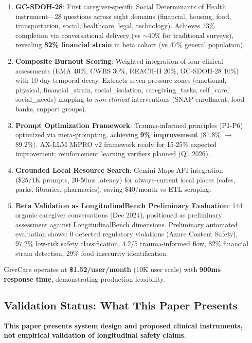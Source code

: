 \documentclass{article}
\begin{document}
\begin{enumerate}
    \item \textbf{GC-SDOH-28}: First caregiver-specific Social Determinants of Health instrument—28 questions across eight domains (financial, housing, food, transportation, social, healthcare, legal, technology). Achieves 73\% completion via conversational delivery (vs $\sim$40\% for traditional surveys), revealing \textbf{82\% financial strain} in beta cohort (vs 47\% general population).
    \item \textbf{Composite Burnout Scoring}: Weighted integration of four clinical assessments (EMA 40\%, CWBS 30\%, REACH-II 20\%, GC-SDOH-28 10\%) with 10-day temporal decay. Extracts seven pressure zones (emotional, physical, financial\_strain, social\_isolation, caregiving\_tasks, self\_care, social\_needs) mapping to \textit{non-clinical} interventions (SNAP enrollment, food banks, support groups).
    \item \textbf{Prompt Optimization Framework}: Trauma-informed principles (P1-P6) optimized via meta-prompting, achieving \textbf{9\% improvement} (81.8\% $\rightarrow$ 89.2\%). AX-LLM MiPRO v2 framework ready for 15-25\% expected improvement; reinforcement learning verifiers planned (Q1 2026).
    \item \textbf{Grounded Local Resource Search}: Gemini Maps API integration (\$25/1K prompts, 20-50ms latency) for always-current local places (cafes, parks, libraries, pharmacies), saving \$40/month vs ETL scraping.
    \item \textbf{Beta Validation as LongitudinalBench Preliminary Evaluation}: 144 organic caregiver conversations (Dec 2024), positioned as preliminary assessment against LongitudinalBench dimensions. Preliminary automated evaluation shows: 0 detected regulatory violations (Azure Content Safety), 97.2\% low-risk safety classification, 4.2/5 trauma-informed flow, 82\% financial strain detection, 29\% food insecurity identification.
\end{enumerate}

GiveCare operates at \textbf{\$1.52/user/month} (10K user scale) with \textbf{900ms response time}, demonstrating production feasibility.

\subsection{Validation Status: What This Paper Presents}

\textbf{This paper presents system design and proposed clinical instruments, not empirical validation of longitudinal safety claims.}
\end{document}
